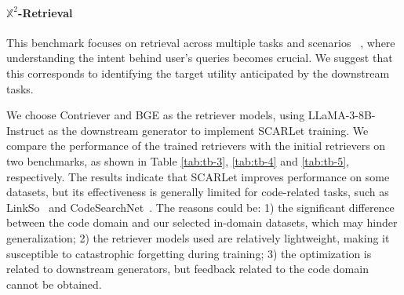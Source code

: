 \documentclass[11pt]{article}
\begin{document}
\paragraph{$\mathbb{X}^2$-Retrieval} This benchmark focuses on retrieval across multiple tasks and scenarios ~\citep{tart}, where understanding the intent behind user's queries becomes crucial. We suggest that this corresponds to identifying the target utility anticipated by the downstream tasks.

We choose Contriever and BGE as the retriever models, using LLaMA-3-8B-Instruct as the downstream generator to implement SCARLet training. We compare the performance of the trained retrievers with the initial retrievers on two benchmarks, as shown in Table \ref{tab:tb-3}, \ref{tab:tb-4} and \ref{tab:tb-5}, respectively. The results indicate that SCARLet improves performance on some datasets, but its effectiveness is generally limited for code-related tasks, such as LinkSo~\citep{linkso} and CodeSearchNet~\citep{codesearchnet}. The reasons could be: 1) the significant difference between the code domain and our selected in-domain datasets, which may hinder generalization; 2) the retriever models used are relatively lightweight, making it susceptible to catastrophic forgetting during training; 3) the optimization is related to downstream generators, but feedback related to the code domain cannot be obtained.
\end{document}
